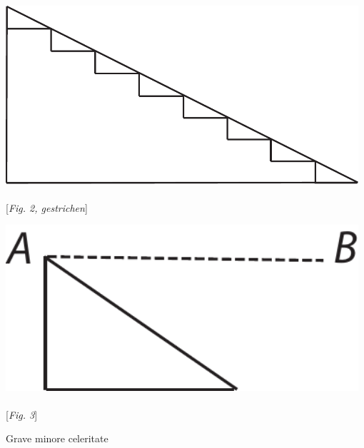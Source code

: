 \begin{minipage}[t]{0.26\textwidth}
\includegraphics[width=0.98\textwidth]{images/LH035,14,02_114r-d2.pdf}\\ \\
\noindent
\centering
[\textit{Fig. 2, gestrichen}]
\end{minipage}
\hspace*{25mm}
\begin{minipage}[t]{0.26\textwidth}
\includegraphics[width=0.98\textwidth]{images/LH035,14,02_114r-d3.pdf}\\ \\
\noindent
\centering
[\textit{Fig. 3}]
\end{minipage}
\pend
\count{}
\count{}
\count{}
\vspace{2.5em}
\pstart
{}
Grave\protect{} minore celeritate\protect{}
